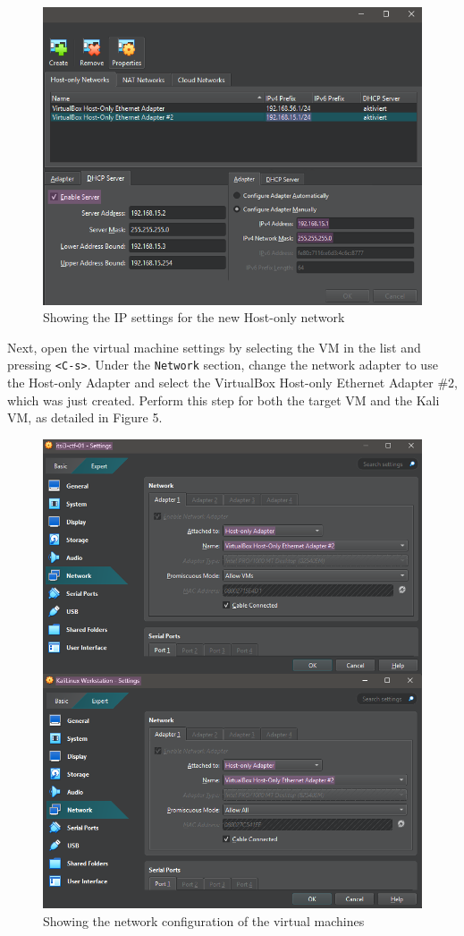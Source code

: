 \documentclass[a4paper]{article}
\newcommand{\abc}{\hfill \break}
\begin{document}
\begin{figure}[h]
	\includegraphics[scale=0.4]{./images/nwipsfr.png}
	\centering
	\caption{Showing the IP settings for the new Host-only network}
	\label{fig:nwconf}
\end{figure}\abc
Next, open the virtual machine settings by selecting the VM in the list and pressing \texttt{<C-s>}. Under the \texttt{Network} section, change the network adapter to use the Host-only Adapter and select the VirtualBox Host-only Ethernet Adapter \#2, which was just created. Perform this step for both the target VM and the Kali VM, as detailed in Figure 5.
\newpage
\begin{figure}[ht]
	\includegraphics[scale=0.4]{./images/vmnwconf.png}
	\centering
	\caption{Showing the network configuration of the virtual machines}
\end{figure}\abc
\newpage
\end{document}
